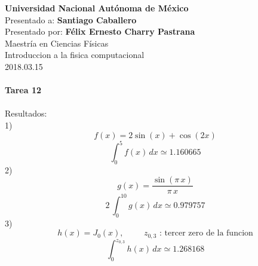 \documentclass[10pt,letterpaper]{article}
\author{F\'elix Ernesto Charry Pastrana}
\begin{document}
\textbf{Universidad Nacional Autónoma de México} \\
Presentado a: \textbf{Santiago Caballero} \\
Presentado por: \textbf{Félix Ernesto Charry Pastrana }\\
Maestría en Ciencias Físicas \\
Introduccion a la fisica computacional \\
2018.03.15 \\
\\
{\Large \textbf{Tarea 12}}
\\
\\
Resultados: 
\\
1) 
\[
f(x) = 2\sin(x) + \cos(2x)
\]
\[
\int_0^5 f(x) \,dx \simeq 1.160665 
\]
2) 
\[
g(x) = \dfrac{\sin(\pi\,x)}{\pi\,x}
\]
\[
2\,\int_0^10 g(x) \,dx \simeq 0.979757
\]
3) 
\[
h(x) = J_0(x), \hspace{1cm} z_{0,3}\text{ : tercer zero de la funcion}
\]
\[
\int_0^{z_{0,3}} h(x) \,dx \simeq 1.268168
\]
\end{document}

